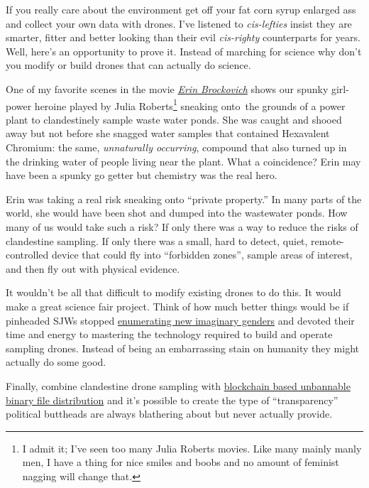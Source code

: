 If you really care about the environment get off your fat corn syrup
enlarged ass and collect your own data with drones. I've listened to
\emph{cis-lefties} insist they are smarter, fitter and better looking
than their evil \emph{cis-righty} counterparts for years. Well, here's
an opportunity to prove it. Instead of marching for science why don't
you modify or build drones that can actually do science.

One of my favorite scenes in the movie
\href{https://en.wikipedia.org/wiki/Erin_Brockovich_(film)}{\emph{Erin
Brockovich}} shows our spunky girl-power heroine played by Julia
Roberts\footnote{I admit it; I've seen too many Julia Roberts movies. Like many mainly
manly men, I have a thing for nice smiles and boobs and no amount of
feminist nagging will change that.} %
sneaking onto~the
grounds of a power plant to clandestinely sample waste water ponds. She
was caught and shooed away but not before she snagged water samples that
contained Hexavalent Chromium: the same, \emph{unnaturally occurring},
compound that also turned up in the drinking water of people living near
the plant. What a coincidence? Erin may have been a spunky go getter but
chemistry was the real hero.

Erin was taking a real risk sneaking onto ``private property.'' In many
parts of the world, she would have been shot and dumped into the
wastewater ponds. How many of us would take such a risk? If only there
was a way to reduce the risks of clandestine sampling. If only there was
a small, hard to detect, quiet, remote-controlled device that could fly
into ``forbidden zones'', sample areas of interest, and then fly out
with physical evidence.

It wouldn't be all that difficult to modify existing drones to do this.
It would make a great science fair project. Think of how much better
things would be if pinheaded SJWs stopped
\href{http://ageofshitlords.com/complete-list-of-all-tumblr-sexualities-so-far}{enumerating
new imaginary genders} and devoted their time and energy to mastering
the technology required to build and operate sampling drones. Instead of
being an embarrassing stain on humanity they might actually do some
good.

Finally, combine clandestine drone sampling with
\href{https://lbry.io/learn}{blockchain based unbannable binary file
distribution} and it's possible to create the type of ``transparency''
political buttheads are always blathering about but never actually
provide.

